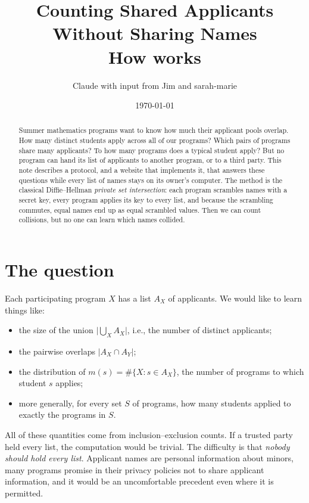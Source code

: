 \documentclass[11pt]{article}
\title{Counting Shared Applicants Without Sharing Names\\[4pt]
  \large How \site{} works}
\author{Claude with input from Jim and sarah-marie}
\date{\today}
\begin{document}
\maketitle

\begin{abstract}
  Summer mathematics programs want to know how much their applicant pools overlap. How many
  distinct students apply across all of our programs? Which pairs of programs share many
  applicants? To how many programs does a typical student apply? But no program can hand its list of
  applicants to another program, or to a third party. This note describes a protocol, and a website
  that implements it, that answers these questions while every list of names stays on its owner's
  computer. The method is the classical Diffie--Hellman \emph{private set intersection}: each program
  scrambles names with a secret key, every program applies its key to every list, and because
  the scrambling commutes, equal names end up as equal scrambled values. Then we can count
  collisions, but no one can learn which names collided.
\end{abstract}

\tableofcontents

\section{The question}\label{sec:question}

Each participating program $X$ has a list $A_X$ of applicants. We would like to learn things like:
\begin{itemize}[nosep]
  \item the size of the union $\bigl|\bigcup_X A_X\bigr|$, i.e., the number of distinct applicants;
  \item the pairwise overlaps $|A_X \cap A_Y|$;
  \item the distribution of $m(s) = \#\{X : s \in A_X\}$, the number of programs to which student $s$ applies;
  \item more generally, for every set $S$ of programs, how many students applied to exactly the programs in $S$.
\end{itemize}
All of these quantities come from inclusion--exclusion counts. If a trusted party held every list,
the computation would be trivial. The difficulty is that \emph{nobody should hold every list}.
Applicant names are personal information about minors, many programs promise in their privacy
policies not to share applicant information, and it would be an uncomfortable precedent even
where it is permitted.
\end{document}
